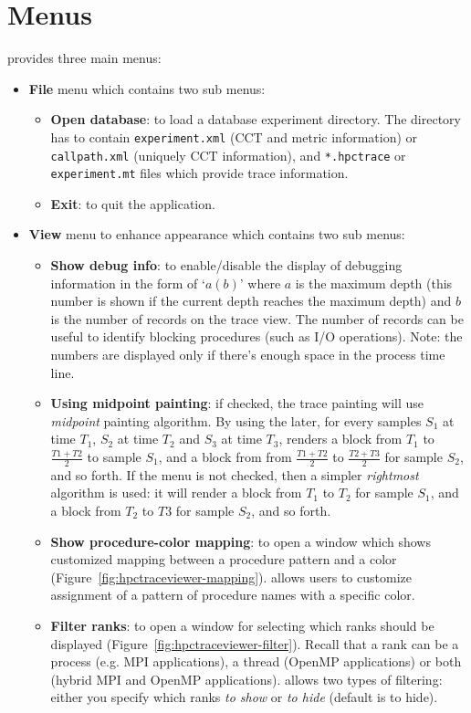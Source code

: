 \section{Menus}
\hpctraceviewer{} provides three main menus:
\begin{itemize}
 \item \textbf{File} menu which contains two sub menus:
 \begin{itemize}
   \item \textbf{Open database}: to load a database experiment directory. The directory has to contain \texttt{experiment.xml} (CCT and metric information) or \texttt{callpath.xml} (uniquely CCT information), and \texttt{*.hpctrace} or \texttt{experiment.mt} files which provide trace information.
   \item \textbf{Exit}: to quit the application.
 \end{itemize}
 \item \textbf{View} menu to enhance appearance which contains two sub menus:
 \begin{itemize}
   \item \textbf{Show debug info}: to enable/disable the display of debugging information in the form of `$a(b)$' where $a$ is the maximum depth (this number is shown if the current depth reaches the maximum depth) and $b$ is the number of records on the trace view. 
The number of records can be useful to identify blocking procedures (such as I/O operations). Note: the numbers are displayed only if there's enough space in the process time line.
   \item \textbf{Using midpoint painting}: if checked, the trace painting will use \emph{midpoint} painting algorithm. By using the later, for every samples $S_1$ at time $T_1$, $S_2$ at time $T_2$ and $S_3$ at time $T_3$, \hpctraceviewer{} renders a block from $T_1$ to $\frac{T1+T2}{2}$ to sample $S_1$, and a block from from  $\frac{T1+T2}{2}$ to  $\frac{T2+T3}{2}$ for sample $S_2$, and so forth. 
If the menu is not checked, then a simpler \emph{rightmost} algorithm is used: it will render a block from  $T_1$ to $T_2$ for sample $S_1$, and a block from $T_2$ to  $T3$ for sample $S_2$, and so forth.
   \item \textbf{Show procedure-color mapping}: to open a window which shows customized mapping between a procedure pattern and a color (Figure~\ref{fig:hpctraceviewer-mapping}). \hpctraceviewer{} allows users to customize assignment of a pattern of procedure names with a specific color.
   \item \textbf{Filter ranks}: to open a window for selecting which ranks should be displayed (Figure~\ref{fig:hpctraceviewer-filter}). Recall that a rank can be a process (e.g. MPI applications), a thread (OpenMP applications) or both (hybrid MPI and OpenMP applications). \hpctraceviewer{} allows two types of filtering: either you specify which ranks \textit{to show} or \textit{to hide} (default is to hide). 

\end{itemize}
\end{itemize}
